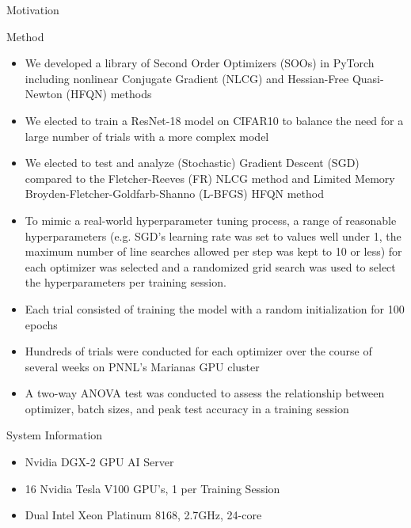 \documentclass[final]{beamer}
\newlength{\colwidth}
\begin{document}
\begin{frame}[t]
\begin{columns}[t]
\begin{column}{\colwidth}
\begin{alertblock}{Motivation}
      \end{alertblock}

      \begin{block}{Method}
        \begin{itemize}
          \item We developed a library of Second Order Optimizers (SOOs) in PyTorch including nonlinear
                Conjugate Gradient (NLCG) and Hessian-Free Quasi-Newton (HFQN) methods
          \item We elected to train a ResNet-18 model on CIFAR10 to balance the need for a large
                number of trials with a more complex model
          \item We elected to test and analyze (Stochastic) Gradient Descent (SGD) compared to the
                Fletcher-Reeves (FR) NLCG method and Limited Memory Broyden-Fletcher-Goldfarb-Shanno
                (L-BFGS) HFQN method
          \item To mimic a real-world hyperparameter tuning process, a range of reasonable
                hyperparameters (e.g. SGD's learning rate was set to values well under 1, the maximum
                number of line searches allowed per step was kept to 10 or less) for each optimizer was
                selected and a randomized grid search was used to select the hyperparameters per training
                session.
          \item Each trial consisted of training the model with a random initialization for 100 epochs
          \item Hundreds of trials were conducted for each optimizer over the course of several
                weeks on PNNL's Marianas GPU cluster
          \item A two-way ANOVA test was conducted to assess the relationship between optimizer,
                batch sizes, and peak test accuracy in a training session
        \end{itemize}

      \end{block}
      \begin{block}{System Information}
        \begin{itemize}
          \item Nvidia DGX-2 GPU AI Server
          \item 16 Nvidia Tesla V100 GPU's, 1 per Training Session
          \item Dual Intel Xeon Platinum 8168, 2.7GHz, 24-core
        \end{itemize}
      \end{block}


\end{column}
\end{columns}
\end{frame}
\end{document}
